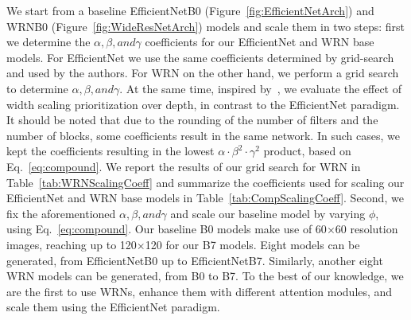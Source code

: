 \documentclass[journal]{IEEEtran}
\begin{document}
 We start from a baseline EfficientNetB0 (Figure~\ref{fig:EfficientNetArch}) and WRNB0 (Figure~\ref{fig:WideResNetArch}) models and scale them in two steps: first we determine the $\alpha, \beta, and \gamma$ coefficients for our EfficientNet and WRN base models. For EfficientNet we use the same coefficients determined by grid-search and used by the authors. For WRN on the other hand, we perform a grid search to determine $\alpha, \beta,and \gamma$. At the same time, inspired by~\cite{bello2021revisiting}, we evaluate the effect of width scaling prioritization over depth, in contrast to the EfficientNet paradigm. It should be noted that due to the rounding of the number of filters and the number of blocks, some coefficients result in the same network. In such cases, we kept the coefficients resulting in the lowest $\alpha \cdot \beta^{2} \cdot \gamma^{2}$ product, based on Eq.~\ref{eq:compound}. We report the results of our grid search for WRN in Table~\ref{tab:WRNScalingCoeff} and summarize the coefficients used for scaling our EfficientNet and WRN base models in Table~\ref{tab:CompScalingCoeff}.
Second, we fix the aforementioned $\alpha, \beta, and \gamma$ and scale our baseline model by varying $\phi$, using Eq.~\ref{eq:compound}. Our baseline B0 models make use of 60$\times$60 resolution images, reaching up to 120$\times$120 for our B7 models. Eight models can be generated, from EfficientNetB0 up to EfficientNetB7. Similarly, another eight WRN models can be generated, from B0 to B7. To the best of our knowledge, we are the first to use WRNs, enhance them with different attention modules, and scale them using the EfficientNet paradigm.
\end{document}
